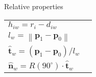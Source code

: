Relative properties
\begin{table}[H]
\begin{tabular}{ll}
$ h_{iw} = r_{i} - d_{iw} $ & \\
$ l_{w} = \left\|\mathbf{p}_{1} - \mathbf{p}_{0}\right\| $ & \\
$ \hat{\mathbf{t}}_{w} = \left(\mathbf{p}_{1} - \mathbf{p}_{0}\right) / l_{w} $ & \\
$ \hat{\mathbf{n}}_{w} = R(90^{\circ}) \cdot \hat{\mathbf{t}}_{w} $ & \\
\end{tabular}
\end{table}

